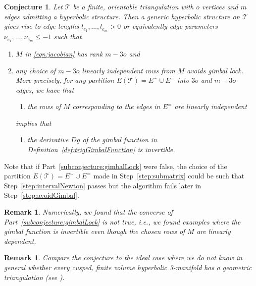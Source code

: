 \documentclass[utopia,fullpage]{nmd/article}
\newcommand{\negSpace}{\!}
\newtheorem{conjecture}[theorem]{Conjecture}
\newtheorem{remark}[theorem]{Remark}
\newcommand{\negSpace}{}
\newcommand\trig{\mathcal{T}}
\begin{document}
\begin{conjecture} \label{conjecture:main}
Let $\trig$\negSpace{} be a finite, orientable triangulation with $o$ vertices and $m$ edges admitting a hyperbolic structure. Then a generic hyperbolic structure on $\trig$\negSpace{} gives rise to edge lengths $l_{e_1},\dots, l_{e_m}>0$ or equivalently edge parameters $\nu_{e_1},\dots,\nu_{e_m}\leq -1$ such that 
\begin{enumerate}
\item $M$ in \eqref{eqn:jacobian} has rank $m-3o$ and \label{subconjecture:Rank}
\item any choice of $m-3o$ linearly independent rows from $M$ avoids gimbal lock. More precisely, for any partition $E(\trig)=E^\sim \cup E^=$ into $3o$ and $m-3o$ edges, we have that\label{subconjecture:gimbalLock}
\begin{enumerate}
\item[1.] the rows of $M$ corresponding to the edges in $E^=$ are linearly independent
\end{enumerate}
implies that
\begin{enumerate}
\item[2.] the derivative $Dg$ of the gimbal function in Definition~\ref{def:trigGimbalFunction} is invertible.
\end{enumerate}
\end{enumerate}
\end{conjecture}

Note that if Part~\eqref{subconjecture:gimbalLock} were false, the choice of the partition $E(\trig)=E^\sim\cup E^=$ made in Step~\ref{step:submatrix} could be such that Step~\ref{step:intervalNewton} passes but the algorithm fails later in Step~\ref{step:avoidGimbal}.

\begin{remark}
Numerically, we found that the converse of Part~\eqref{subconjecture:gimbalLock} is not true, i.e., we found examples where the gimbal function is invertible even though the chosen rows of $M$ are linearly dependent.
\end{remark}

\begin{remark}
Compare the conjecture to the ideal case where we do not know in general whether every cusped, finite volume hyperbolic 3-manifold has a geometric triangulation (see \cite{PetronioWeeks:partiallyFlatTrig,LuoSchleimerTillmann:virtualGeometricTrig,Goerner:DodecahedralGeometricTriangulation}).
\end{remark}
\end{document}
